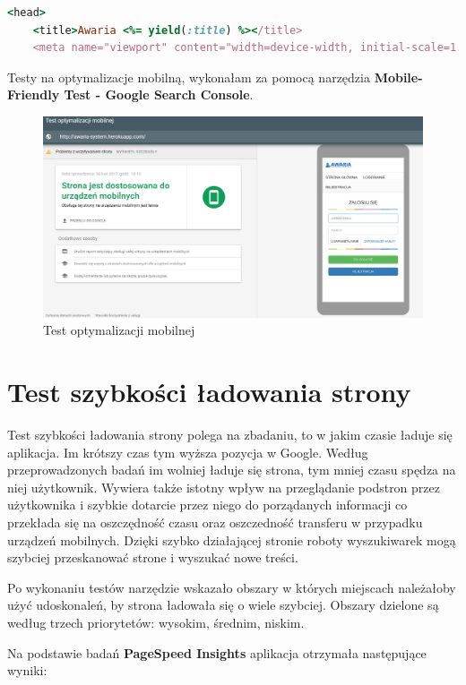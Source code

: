 \documentclass[openright]{xmgr}
\begin{document}
	\begin{lstlisting}[language=Ruby,lineskip={-1pt},caption=Meta tag odpowiedzialny za skalowanie]
	<head>
	<title>Awaria <%= yield(:title) %></title>
	<meta name="viewport" content="width=device-width, initial-scale=1.0">
	\end{lstlisting}
	
	Testy na optymalizacje mobilną, wykonałam za pomocą narzędzia \textbf{Mobile-Friendly Test - Google Search Console}.
	
	\begin{figure}[!tbh]
		\centering
		\includegraphics[width=\linewidth]{image/testm}
		\caption{Test optymalizacji mobilnej}
	\end{figure}
	
	\section{Test szybkości ładowania strony}
	Test szybkości ładowania strony polega na zbadaniu, to w jakim czasie ładuje się aplikacja. Im krótszy czas tym wyższa pozycja w Google. Według przeprowadzonych badań im wolniej ładuje się strona, tym mniej czasu spędza na niej użytkownik. Wywiera także istotny wpływ na przeglądanie podstron przez użytkownika i szybkie dotarcie przez niego do porządanych informacji co przekłada się na oszczędność czasu oraz oszczedność transferu w przypadku urządzeń mobilnych. Dzięki szybko działającej stronie roboty wyszukiwarek mogą szybciej przeskanować strone i wyszukać nowe treści.
	
	Po wykonaniu testów narzędzie wskazało obszary w których miejscach należałoby użyć udoskonaleń, by strona ładowała się o wiele szybciej. Obszary dzielone są według trzech priorytetów: wysokim, średnim, niskim.
	
	Na podstawie badań \textbf{PageSpeed Insights} aplikacja otrzymała następujące wyniki:
	
\end{document}
